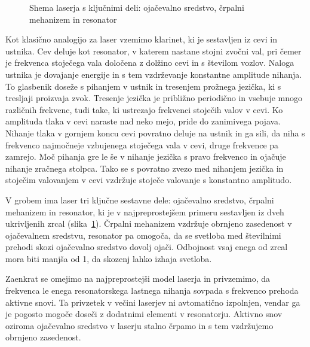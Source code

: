 \begin{figure}[h]
\centering
\def\svgwidth{100truemm} 

\caption{Shema laserja s ključnimi deli: ojačevalno sredstvo, črpalni mehanizem in resonator}
\label{fig:shemalaserja}
\end{figure}
\begin{remark}
Kot klasično analogijo za laser vzemimo klarinet, ki je sestavljen iz 
cevi in ustnika. Cev deluje kot resonator, v katerem nastane 
stojni zvočni val, pri čemer je frekvenca stoječega vala določena z 
dolžino cevi in s številom vozlov. Naloga ustnika je dovajanje energije 
in s tem vzdrževanje konstantne amplitude nihanja. To glasbenik doseže s 
pihanjem v ustnik in tresenjem prožnega jezička, ki s tresljaji proizvaja 
zvok. Tresenje jezička je približno periodično in vsebuje mnogo različnih 
frekvenc, tudi take, ki ustrezajo frekvenci stoječih valov v cevi. 
Ko amplituda tlaka v cevi naraste nad neko mejo, pride do zanimivega
pojava. Nihanje tlaka v gornjem koncu cevi povratno deluje na ustnik
in ga sili, da niha s frekvenco najmočneje vzbujenega stoječega vala v cevi,
druge frekvence pa zamrejo. Moč pihanja gre le še v
nihanje jezička s pravo frekvenco in ojačuje nihanje zračnega stolpca. 
Tako se s povratno zvezo med nihanjem jezička in stoječim valovanjem v cevi
vzdržuje stoječe valovanje s konstantno amplitudo. 
\end{remark}

V grobem ima laser tri ključne sestavne dele: ojačevalno sredstvo, 
črpalni mehanizem in resonator, ki je v najpreprostejšem primeru sestavljen iz dveh 
ukrivljenih zrcal (slika~\ref{fig:shemalaserja}). Črpalni 
mehanizem vzdržuje obrnjeno zasedenost v ojačevalnem sredstvu, resonator pa omogoča,
da se svetloba med številnimi prehodi skozi ojačevalno sredstvo dovolj ojači.
Odbojnost vsaj enega od zrcal 
mora biti manjša od 1, da skozenj lahko izhaja svetloba.

Zaenkrat se omejimo na najpreprostejši model laserja in 
privzemimo, da frekvenca le enega resonatorskega lastnega nihanja sovpada s 
frekvenco prehoda aktivne snovi. Ta privzetek v večini laserjev ni
avtomatično izpolnjen, vendar ga je pogosto mogoče doseči z dodatnimi elementi 
v resonatorju. Aktivno snov oziroma ojačevalno sredstvo v laserju stalno 
črpamo in s tem vzdržujemo obrnjeno zasedenost. 

